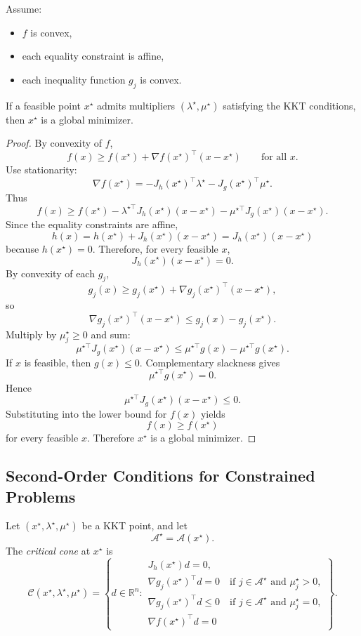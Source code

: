 \begin{theorem}\label{thm:l3-kkt-sufficient-conditions-for-convex-problems}
	Assume:
	\begin{itemize}
		\item $f$ is convex,
		\item each equality constraint is affine,
		\item each inequality function $g_j$ is convex.
	\end{itemize}
	If a feasible point $x^\star$ admits multipliers $(\lambda^\star,\mu^\star)$ satisfying the KKT conditions, then $x^\star$ is a global minimizer.
\end{theorem}
\begin{proof}
	By convexity of $f$,
	\[
		f(x)\ge f(x^\star)+\nabla f(x^\star)^\top(x-x^\star)
		\qquad \text{for all } x.
	\]
	Use stationarity:
	\[
		\nabla f(x^\star)
		=
		-J_h(x^\star)^\top \lambda^\star
		-J_g(x^\star)^\top \mu^\star.
	\]
	Thus
	\[
		f(x)\ge f(x^\star)-\lambda^{\star\top}J_h(x^\star)(x-x^\star)-\mu^{\star\top}J_g(x^\star)(x-x^\star).
	\]
	Since the equality constraints are affine,
	\[
		h(x)=h(x^\star)+J_h(x^\star)(x-x^\star)=J_h(x^\star)(x-x^\star)
	\]
	because $h(x^\star)=0$. Therefore, for every feasible $x$,
	\[
		J_h(x^\star)(x-x^\star)=0.
	\]
	By convexity of each $g_j$,
	\[
		g_j(x)\ge g_j(x^\star)+\nabla g_j(x^\star)^\top(x-x^\star),
	\]
	so
	\[
		\nabla g_j(x^\star)^\top(x-x^\star)\le g_j(x)-g_j(x^\star).
	\]
	Multiply by $\mu_j^\star \ge 0$ and sum:
	\[
		\mu^{\star\top}J_g(x^\star)(x-x^\star)
		\le
		\mu^{\star\top}g(x)-\mu^{\star\top}g(x^\star).
	\]
	If $x$ is feasible, then $g(x)\le 0$. Complementary slackness gives
	\[
		\mu^{\star\top}g(x^\star)=0.
	\]
	Hence
	\[
		\mu^{\star\top}J_g(x^\star)(x-x^\star)\le 0.
	\]
	Substituting into the lower bound for $f(x)$ yields
	\[
		f(x)\ge f(x^\star)
	\]
	for every feasible $x$. Therefore $x^\star$ is a global minimizer.
\end{proof}

\subsection{Second-Order Conditions for Constrained Problems}
\label{sec:l3-second-order-conditions-for-constrained-problems}

\begin{definition}\label{def:l3-critical-cone}
	Let $(x^\star,\lambda^\star,\mu^\star)$ be a KKT point, and let
	\[
		\mathcal{A}^\star=\mathcal{A}(x^\star).
	\]
	The \emph{critical cone} at $x^\star$ is
	\[
		\mathcal{C}(x^\star,\lambda^\star,\mu^\star)
		=
		\left\{
		d \in \mathbb{R}^n :
		\begin{array}{l}
			J_h(x^\star)d=0, \\
			\nabla g_j(x^\star)^\top d = 0 \quad \text{if } j \in \mathcal{A}^\star \text{ and } \mu_j^\star>0, \\
			\nabla g_j(x^\star)^\top d \le 0 \quad \text{if } j \in \mathcal{A}^\star \text{ and } \mu_j^\star=0, \\
			\nabla f(x^\star)^\top d = 0
		\end{array}
		\right\}.
	\]
\end{definition}

